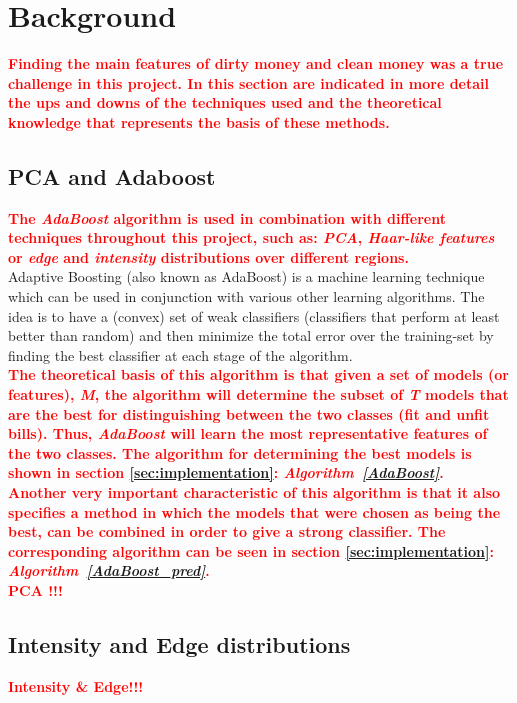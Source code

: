 \documentclass[11pt,twocolumn]{article}
\newcommand{\todo}[1]{\textcolor{red}{\textbf{#1}}}
\begin{document}
	\section{Background}\label{sec:background}
	\todo{\hspace*{10px}Finding the main features of dirty money and clean money was a true challenge in this project. In this section are indicated in more detail the ups and downs of the techniques used and the theoretical knowledge that represents the basis of these methods.}
	\subsection{PCA and Adaboost}\label{sec:PCA}
		\todo{\hspace*{10px}The \emph{AdaBoost} algorithm is used in combination with different techniques throughout this project, such as: \emph{PCA}, \emph{Haar-like features} or \emph{edge} and \emph{intensity} distributions over different regions.\\}
		\hspace*{10px}Adaptive Boosting (also known as AdaBoost) is a machine learning technique which can be used in conjunction with various other learning algorithms. The idea is to have a (convex) set of weak classifiers (classifiers that perform at least better than random) and then minimize the total error over the training-set by finding the best classifier at each stage of the algorithm.\\
		\todo{\hspace*{10px}The theoretical basis of this algorithm is that given a set of models (or features), \emph{M}, the algorithm will determine the subset of \emph{T} models that are the best for distinguishing between the two classes (fit and unfit bills). Thus, \emph{AdaBoost} will learn the most representative features of the two classes. The algorithm for determining the best models is shown in section \ref{sec:implementation}: \emph{Algorithm~\ref{AdaBoost}}.\\}
		\todo{\hspace*{10px}Another very important characteristic of this algorithm is that it also specifies a method in which the models that were chosen as being the best, can be combined in order to give a strong classifier. The corresponding algorithm can be seen in section \ref{sec:implementation}: \emph{Algorithm~\ref{AdaBoost_pred}}.\\}
		\todo{\hspace*{10px}PCA !!!}
	\subsection{Intensity and Edge distributions}\label{sec:Intensity_Edge}
		\todo{\hspace*{10px}Intensity \& Edge!!!\\}
\end{document}
